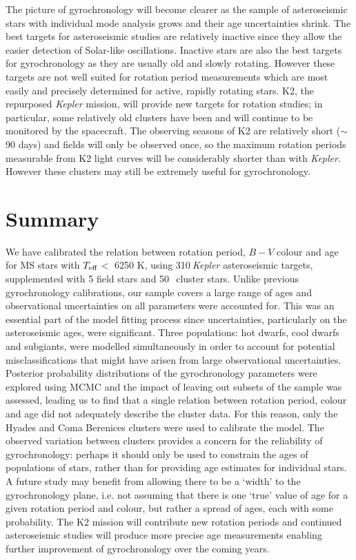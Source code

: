 \documentclass[useAMS, usenatbib]{mn2e}
\newcommand{\teff}{$T_{\rm{eff}}$}
\newcommand{\nastero}{310}
\newcommand{\nHC}{50~}
\begin{document}
The picture of gyrochronology will become clearer as the sample of
asteroseismic stars with individual mode analysis grows and their age
uncertainties shrink.
The best targets for asteroseismic studies are relatively inactive since they
allow the easier detection of Solar-like oscillations.
Inactive stars are also the best targets for gyrochronology as they are
usually old and slowly rotating.
However these targets are not well suited for
rotation period measurements which are most easily and precisely determined
for active, rapidly rotating stars.
K2, the repurposed {\it Kepler} mission, will provide new targets for rotation
studies; in particular, some relatively old clusters have been and will
continue to be monitored by the spacecraft.
The observing seasons of K2 are relatively short ($\sim$ 90 days) and fields
will only be observed once, so the maximum rotation periods measurable from
K2 light curves will be considerably shorter than with {\it Kepler}.
However these clusters may still be extremely useful for gyrochronology.

\section{Summary}
\label{sec:conclusions}

We have calibrated the relation between rotation period, $B-V$ colour and age
for MS stars with \teff$<$ 6250 K, using \nastero$~${\it Kepler} asteroseismic
targets, supplemented with 5 field stars and \nHC$~$cluster stars.
Unlike previous gyrochronology calibrations, our sample covers a large range
of ages and observational uncertainties on all parameters were accounted for.
This was an essential part of the model fitting process since
uncertainties, particularly on the asteroseismic ages, were significant.
Three populations: hot dwarfs, cool dwarfs and subgiants, were modelled
simultaneously in order to account for potential misclassifications that
might have arisen from large observational uncertainties.
Posterior probability distributions of the gyrochronology parameters were
explored using MCMC and the impact of leaving out subsets of the sample was
assessed, leading us to find that a single relation between rotation period,
colour and age did not adequately describe the cluster data.
For this reason, only the Hyades and Coma Berenices clusters were used to
calibrate the model.
The observed variation between clusters provides a concern for the reliability
of gyrochronology: perhaps it should only be used to constrain the ages of
populations of stars, rather than for providing age estimates for individual
stars.
A future study may benefit from allowing there to be a `width' to the
gyrochronology plane, i.e. not assuming that there is one `true' value of age
for a given rotation period and colour, but rather a spread of ages, each with
some probability.
The K2 mission will contribute new rotation periods and continued
asteroseismic studies will produce more precise age measurements enabling
further improvement of gyrochronology over the coming years.
\end{document}
